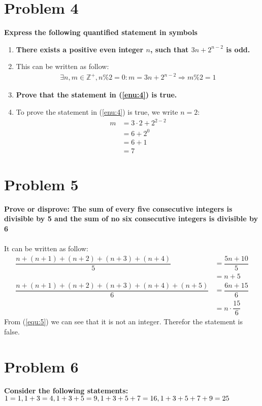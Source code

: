 \documentclass[english,11pt,a4paper]{article}
\begin{document}
\section*{Problem 4}
\textbf{Express the following quantified statement in symbols}
\begin{enumerate}[a]
\item \label{enu:4}\textbf{There exists a positive even integer $n$, such that $3n+2^{n-2}$ is odd.}
\item[] This can be written as follow:
\begin{align}
\exists n, m \in \mathbb{Z}^+, n\%2=0 : m= 3n+2^{n-2} \Rightarrow m\%2=1
\end{align}
\item \textbf{Prove that the statement in (\ref{enu:4}) is true.}
\item[] To prove the statement in (\ref{enu:4}) is true, we write $n=2$:
\begin{align}
m &= 3\cdot 2+2^{2-2}\\
	&=6+2^0\\
	&=6+1\\
	&=7
\end{align}
\end{enumerate}



\section*{Problem 5}
\textbf{Prove or disprove: The sum of every five consecutive integers is divisible by 5 and the sum of no six consecutive integers is divisible by 6}
\\
\\
It can be written as follow:
\begin{align}
\dfrac{n+(n+1)+(n+2)+(n+3)+(n+4)}{5} 
	&=\dfrac{5n+10}{5}\\
	&=n+5 \\
\dfrac{n+(n+1)+(n+2)+(n+3)+(n+4)+(n+5)}{6}
	&= \dfrac{6n+15}{6} \\
	&= n\cdot \dfrac{15}{6} \label{equ:5}
\end{align}
From (\ref{equ:5}) we can see that it is not an integer.
Therefor the statement is false.


\section*{Problem 6}
\textbf{Consider the following statements:}
\\
$1=1, \\
1+3=4, \\
1+3+5=9, \\
1+3+5+7 = 16, \\
1+3+5+7+9=25$
\end{document}
